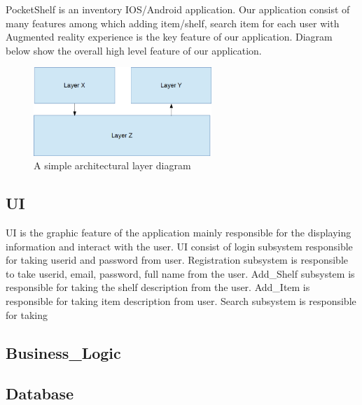 PocketShelf is an inventory IOS/Android application. Our application consist of many features among which adding item/shelf, search item for each user with Augmented reality experience is the key feature of our application. Diagram below show the overall high level feature of our application.


\begin{figure}[h!]
	\centering
 	\includegraphics[width=0.60\textwidth]{images/layers}
 \caption{A simple architectural layer diagram}
\end{figure}

\subsection{UI}
UI is the graphic feature of the application mainly responsible for the displaying information and interact with the user. UI consist of login subsystem responsible for taking userid and password from user. Registration subsystem is responsible to take userid, email, password, full name from the user. Add\_Shelf subsystem is responsible for taking the shelf description from the user. Add\_Item is responsible for taking item description from user. Search subsystem is responsible for taking  

\subsection{Business\_Logic}




\subsection{Database}